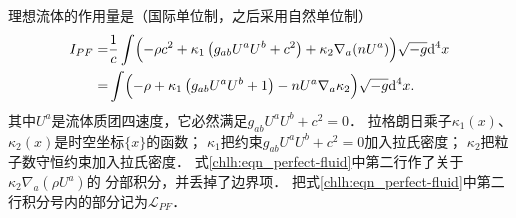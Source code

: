 理想流体的作用量\cite{Ray-1972}是（国际单位制，之后采用自然单位制）
\begin{equation}\label{chlh:eqn_perfect-fluid}
    \begin{aligned}
    I_{PF}=&\frac{1}{c}\int \Bigl(-\rho c^2
    +\kappa_1\left(g_{ab}U^a U^b+c^2 \right) 
    +\kappa_2 \nabla_a (n U^a)  \Bigr)
    \sqrt{-g}  {\rm d}^4x  \\
    =&\int \Bigl(-\rho
    +\kappa_1\left(g_{ab}U^a U^b+1 \right) 
    -n U^a \nabla_a\kappa_2   \Bigr)
    \sqrt{-g}  {\rm d}^4x .
\end{aligned}
\end{equation}
其中$U^a$是流体质团四速度，它必然满足$g_{ab}U^a U^b+c^2=0$．
拉格朗日乘子$\kappa_1(x)$、$\kappa_2(x)$是时空坐标$\{x\}$的函数；
$\kappa_1$把约束$g_{ab}U^a U^b+c^2=0$加入拉氏密度；
$\kappa_2$把粒子数守恒约束加入拉氏密度．
式\eqref{chlh:eqn_perfect-fluid}中第二行作了关于$\kappa_2 \nabla_a (\rho U^a) $的
分部积分，并丢掉了边界项．
把式\eqref{chlh:eqn_perfect-fluid}中第二行积分号内的部分记为$\mathscr{L}_{PF}$．

